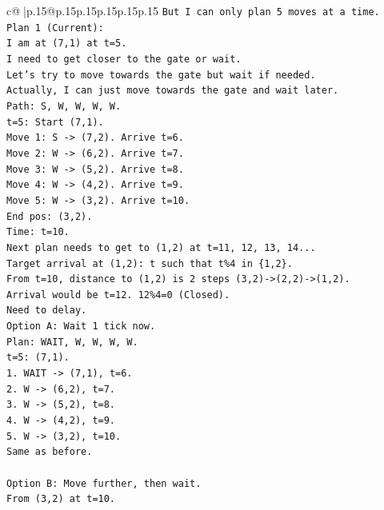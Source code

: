\documentclass{article}
\begin{document}
{\begin{supertabular}{c@{$\;$}|p{.15\linewidth}@{}p{.15\linewidth}p{.15\linewidth}p{.15\linewidth}p{.15\linewidth}p{.15\linewidth}}
{{{\texttt{But I can only plan 5 moves at a time.} \\
\texttt{Plan 1 (Current):} \\
\texttt{I am at (7,1) at t=5.} \\
\texttt{I need to get closer to the gate or wait.} \\
\texttt{Let's try to move towards the gate but wait if needed.} \\
\texttt{Actually, I can just move towards the gate and wait later.} \\
\texttt{Path: S, W, W, W, W.} \\
\texttt{t=5: Start (7,1).} \\
\texttt{Move 1: S {-}> (7,2). Arrive t=6.} \\
\texttt{Move 2: W {-}> (6,2). Arrive t=7.} \\
\texttt{Move 3: W {-}> (5,2). Arrive t=8.} \\
\texttt{Move 4: W {-}> (4,2). Arrive t=9.} \\
\texttt{Move 5: W {-}> (3,2). Arrive t=10.} \\
\texttt{End pos: (3,2).} \\
\texttt{Time: t=10.} \\
\texttt{Next plan needs to get to (1,2) at t=11, 12, 13, 14...} \\
\texttt{Target arrival at (1,2): t such that t\%4 in \{1,2\}.} \\
\texttt{From t=10, distance to (1,2) is 2 steps (3,2){-}>(2,2){-}>(1,2).} \\
\texttt{Arrival would be t=12. 12\%4=0 (Closed).} \\
\texttt{Need to delay.} \\
\texttt{Option A: Wait 1 tick now.} \\
\texttt{Plan: WAIT, W, W, W, W.} \\
\texttt{t=5: (7,1).} \\
\texttt{1. WAIT {-}> (7,1), t=6.} \\
\texttt{2. W {-}> (6,2), t=7.} \\
\texttt{3. W {-}> (5,2), t=8.} \\
\texttt{4. W {-}> (4,2), t=9.} \\
\texttt{5. W {-}> (3,2), t=10.} \\
\texttt{Same as before.} \\
\\ 
\texttt{Option B: Move further, then wait.} \\
\texttt{From (3,2) at t=10.} \\
}}}
\end{supertabular}}
\end{document}
